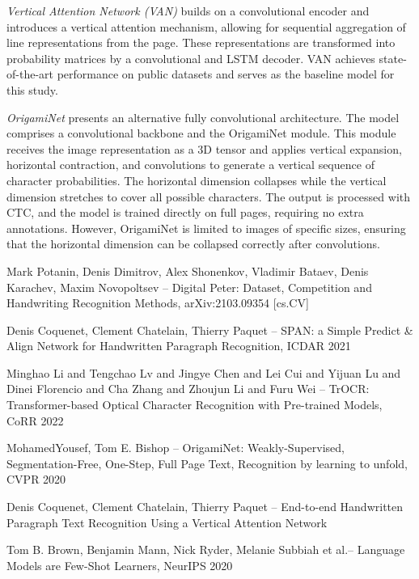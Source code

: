 \documentclass[12pt]{article}
\begin{document}
\begin{itemize}
    \textit{Vertical Attention Network (VAN)} \cite{VAN} builds on a convolutional encoder and introduces a vertical attention mechanism, allowing for sequential aggregation of line representations from the page. These representations are transformed into probability matrices by a convolutional and LSTM decoder. VAN achieves state-of-the-art performance on public datasets and serves as the baseline model for this study.

    \textit{OrigamiNet} \cite{OrigamiNet} presents an alternative fully convolutional architecture. The model comprises a convolutional backbone and the OrigamiNet module. This module receives the image representation as a 3D tensor and applies vertical expansion, horizontal contraction, and convolutions to generate a vertical sequence of character probabilities. The horizontal dimension collapses while the vertical dimension stretches to cover all possible characters. The output is processed with CTC, and the model is trained directly on full pages, requiring no extra annotations. However, OrigamiNet is limited to images of specific sizes, ensuring that the horizontal dimension can be collapsed correctly after convolutions.
\end{itemize}

	
	
\begin{thebibliography}{00}
	Mark Potanin, Denis Dimitrov, Alex Shonenkov, Vladimir Bataev, Denis Karachev, Maxim Novopoltsev -- Digital Peter: Dataset, Competition and Handwriting Recognition Methods, arXiv:2103.09354 [cs.CV]
	
	Denis Coquenet, Clement Chatelain, Thierry Paquet -- SPAN: a Simple Predict \& Align
	Network for Handwritten Paragraph Recognition, ICDAR 2021
	
	Minghao Li and Tengchao Lv and Jingye Chen and Lei Cui and Yijuan Lu and Dinei Florencio and Cha Zhang and Zhoujun Li and Furu Wei -- TrOCR: Transformer-based
	Optical Character Recognition with Pre-trained Models, CoRR 2022
	
	MohamedYousef, Tom E. Bishop -- OrigamiNet: Weakly-Supervised, Segmentation-Free,
	One-Step, Full Page Text, Recognition by learning to unfold, CVPR 2020
	
	Denis Coquenet, Clement Chatelain, Thierry Paquet -- End-to-end Handwritten
	Paragraph Text Recognition Using a Vertical Attention Network
	
	Tom B. Brown, Benjamin Mann, Nick Ryder, Melanie Subbiah et al.-- Language Models
	are Few-Shot Learners, NeurIPS 2020
\end{thebibliography}
	
	
\end{document}

